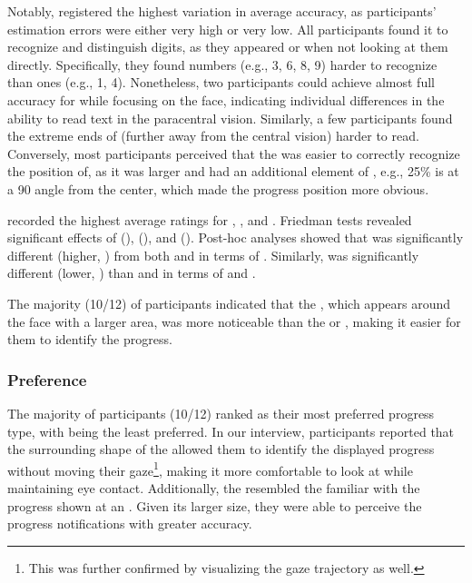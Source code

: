 Notably, \textbar{} registered the highest variation in average accuracy, as participants' estimation errors were either very high or very low. All participants found it  to recognize and distinguish digits, as they appeared  or  when not looking at them directly. Specifically, they found  numbers (e.g., 3, 6, 8, 9) harder to recognize than  ones (e.g., 1, 4). Nonetheless, two participants could achieve almost full accuracy for \textbar{} while focusing on the face, indicating individual differences in the ability to read text in the paracentral vision. Similarly, a few participants found the extreme ends of \linearbar{} (further away from the central vision) harder to read. Conversely, most participants perceived that the \circularbar{} was easier to correctly recognize the position of, as it was larger and had an additional element of , e.g., 25\% is at a 90\textdegree{} angle from the center, which made the progress position more obvious.



\Circularbar{} recorded the highest average ratings for \noticeability{}, \perceivedEaseIdentification{}, and \comfortability{}. Friedman tests revealed significant effects of \noticeability{} (),  \perceivedEaseIdentification{} (), and \comfortability{} (). Post-hoc analyses showed that \circularbar{} was significantly different (higher, ) from both \linearbar{} and \textbar{} in terms of \noticeability{}. Similarly, \textbar{} was significantly different (lower, ) than \linearbar{} and \circularbar{} in terms of \perceivedEaseIdentification{} and \comfortability{}.

The majority (10/12) of participants indicated that the \circularbar{}, which appears around the face with a larger area, was more noticeable than the \textbar{} or \linearbar{}, making it easier for them to identify the progress.



\subsubsection*{Preference}

The majority of participants (10/12) ranked \circularbar{} as their most preferred progress type, with \textbar{} being the least preferred. In our interview, participants reported that the surrounding shape of the \circularbar{} allowed them to identify the displayed progress without moving their gaze\footnote{This was further confirmed by visualizing the gaze trajectory as well.}, making it more comfortable to look at while maintaining eye contact. Additionally, the \circularbar{} resembled the familiar  with the progress shown at an . Given its larger size, they were able to perceive the progress notifications with greater accuracy.

